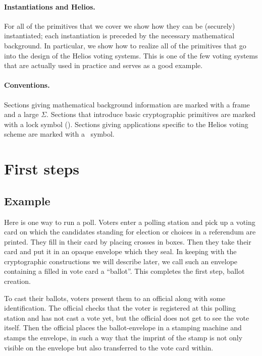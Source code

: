 \documentclass[envcountsame]{llncs}
\begin{document}
\paragraph{Instantiations and Helios.}
For all of the primitives that we cover we show how they can be (securely) instantiated; each instantiation is preceded by the necessary mathematical background.   
In particular, we show how to realize all of the primitives that go into the design of the Helios voting systems.   This is one of the few voting systems that are actually used in practice and serves as a good example.   


\paragraph{Conventions.}  
Sections giving mathematical background information are marked with a frame and a large $\Sigma$. 
Sections that introduce basic cryptographic primitives are marked with a lock symbol (). Sections giving applications specific to the Helios voting
scheme are marked with a \Sun\ symbol. 

\section{First steps}

\subsection{Example}

Here is one way to run a poll. Voters enter a polling station and pick up a voting card on which the candidates standing for election or choices in a referendum are printed. They fill in their card by placing crosses in boxes. Then they take their card and put it in an opaque envelope which they seal. In keeping with the cryptographic constructions we will describe later, we call such an envelope containing a filled in vote card a ``ballot''. This completes the first step, ballot creation.

To cast their ballots, voters present them to an official along with some identification. The official checks that the voter is registered at this polling station and has not cast a vote yet, but the official does not get to see the vote itself. Then the official places the ballot-envelope in a stamping machine and stamps the envelope, in such a way that the imprint of the stamp is not only visible on the envelope but also transferred to the vote card within.
\end{document}
